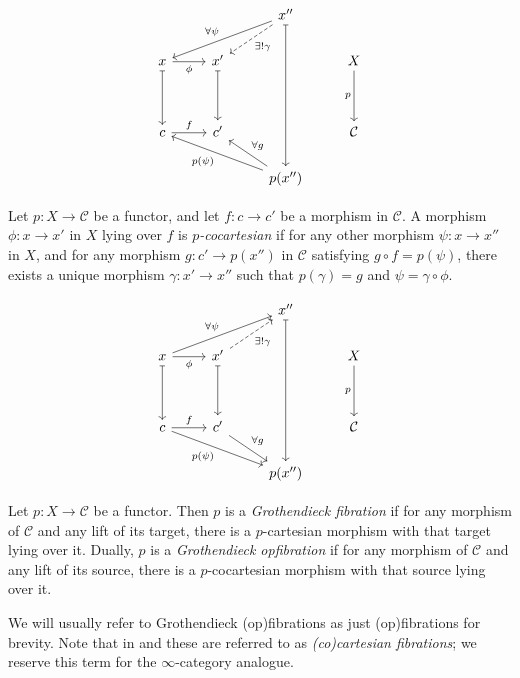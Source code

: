 \documentclass{MetricNotes2023}
\begin{document}
\[\begin{tikzcd}
 & & x'' \arrow[dddd, mapsto, ""] \arrow[dll, swap, "\forall \psi"] \arrow[dl, dashrightarrow, "\exists! \gamma"] & \\
x \arrow[r, swap, "\phi"] \arrow[dd, mapsto, swap, ""] & x' \arrow[dd, mapsto, swap, ""]  & & X \arrow[dd, swap, "p"] \\
& & & \\
c \arrow[r, "f"] & c'  & & \mathcal{C}\\
 & & p(x'') \arrow[llu, "p(\psi)"] \arrow[lu, swap, "\forall g"] & 
\end{tikzcd}\]

\begin{definition}
Let \(p : X \to \mathcal{C}\) be a functor, and let \(f : c \to c'\) be a morphism in \(\mathcal{C}\). A morphism \(\phi : x \to x'\) in \(X\) lying over \(f\) is \textit{\(p\)-cocartesian} if for any other morphism \(\psi : x \to x''\) in \(X\), and for any morphism \(g : c' \to p(x'')\) in \(\mathcal{C}\) satisfying \(g \circ f = p(\psi)\), there exists a unique morphism \(\gamma : x' \to x''\) such that \(p(\gamma)=g\) and \(\psi = \gamma \circ \phi\).  
\end{definition}

\[\begin{tikzcd}
 & & x'' \arrow[dddd, mapsto, ""] & \\
x \arrow[r, swap, "\phi"] \arrow[dd, mapsto, swap, ""] \arrow[urr, "\forall \psi"] & x' \arrow[dd, mapsto, swap, ""] \arrow[ur, dashrightarrow, swap, "\exists! \gamma"] & & X \arrow[dd, swap, "p"] \\
& & & \\
c \arrow[r, "f"] \arrow[rrd, swap, "p(\psi)"] & c' \arrow[rd, "\forall g"]  & & \mathcal{C}\\
 & & p(x'') & 
\end{tikzcd}\]


\begin{definition}\label{opfibration}
Let \(p : X \to \mathcal{C}\) be a functor. Then \(p\) is a \textit{Grothendieck fibration} if for any morphism of \(\mathcal{C}\) and any lift of its target, there is a \(p\)-cartesian morphism with that target lying over it. Dually, \(p\) is a \textit{Grothendieck opfibration} if for any morphism of \(\mathcal{C}\) and any lift of its source, there  is a \(p\)-cocartesian morphism with that source lying over it.
\end{definition}

We will usually refer to Grothendieck (op)fibrations as just (op)fibrations for brevity. Note that in \autocite{symmetricmonoidal} and \autocite{lurie2008higher} these are referred to as \textit{(co)cartesian fibrations}; we reserve this term for the \(\infty\)-category analogue. 
\end{document}
